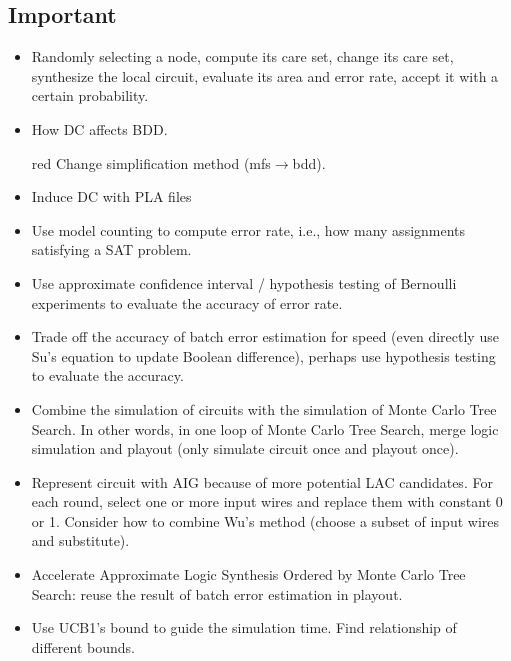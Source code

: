 \documentclass{rpt}
\begin{document}
\subsection{Important}
\begin{itemize}
    \item
        Randomly selecting a node,
        compute its care set,
        change its care set,
        synthesize the local circuit,
        evaluate its area and error rate,
        accept it with a certain probability.
    \item How DC affects BDD\@.
        \begin{color}{red}
            Change simplification method (mfs$\rightarrow$bdd).
        \end{color}
    \item Induce DC with PLA files
    \item Use model counting to compute error rate, i.e., how many assignments satisfying a SAT problem.
    \item Use approximate confidence interval / hypothesis testing of Bernoulli experiments to evaluate the accuracy of error rate.
    \item Trade off the accuracy of batch error estimation for speed
        (even directly use Su's equation to update Boolean difference),
        perhaps use hypothesis testing to evaluate the accuracy.
    \item Combine the simulation of circuits with the simulation of Monte Carlo Tree Search.
        In other words,
        in one loop of Monte Carlo Tree Search,
        merge logic simulation and playout (only simulate circuit once and playout once).
    \item Represent circuit with AIG because of more potential LAC candidates.
        For each round, select one or more input wires and replace them with constant 0 or 1.
        Consider how to combine Wu's method (choose a subset of input wires and substitute).
    \item Accelerate Approximate Logic Synthesis Ordered by Monte Carlo Tree Search:
        reuse the result of batch error estimation in playout.
    \item
        Use UCB1's bound to guide the simulation time.
        Find relationship of different bounds.
\end{itemize}
\end{document}

